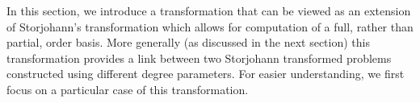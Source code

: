 \begin{comment}
\begin{itemize}
\item $\vec{e}$: uniform 0 shift used for transformation. 
\item $\vec{s}$: original input shift 
\item $\vec{t}$: output shifted degrees of the current basis, with result
from previous subproblems included. i.e., $\left[\vec{s},0,\dots,0\right]$-degrees
of the current basis. 
\item $\vec{b},\vec{a}$: input shift and output shifted degrees for each
reduced subproblem that calls OrderBasis. In the iterative computational
process, input shift $\vec{b}^{\left(i-1\right)}$ corresponds to
input shift $\vec{a}^{\left(i\right)}$. The high degree entries of
$\vec{a}^{\left(i\right)}$ at iteration $i$ is then used as the
input shift $\vec{b}^{\left(i\right)}$ for iteration $i$. 
\end{itemize}
\item dimension:

\begin{itemize}
\item $m,n$: row, column dimension 
\item $k$: number of columns with $\left[\vec{s},0,\dots,0\right]$-degrees
less than degree bound 
\item $l$: number of block rows 
\end{itemize}
\item degrees, order:

\begin{itemize}
\item $\sigma$: order 
\item $\delta$: degree bound 
\item $d$: average degree (=$m\sigma/n$) 
\end{itemize}
\end{itemize}

\end{comment}
{}

In this section, we introduce a transformation that can be viewed
as an extension of Storjohann's transformation which allows for computation
of a full, rather than partial, order basis. More generally (as discussed
in the next section) this transformation provides a link between two
Storjohann transformed problems constructed using different degree
parameters. For easier understanding, we first focus on a particular
case of this transformation. %


